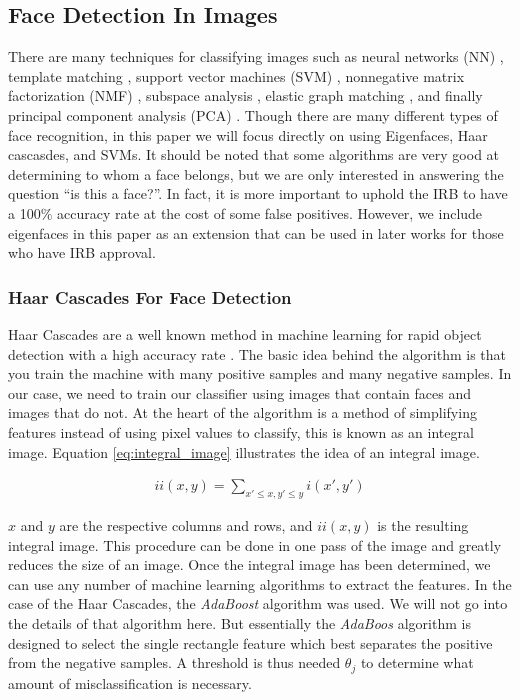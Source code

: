 \documentclass[
	submission,
	final,
	notitlepage,
	narroweqnarray,
	inline,
	twoside,
	]{ieee}
\begin{document}
\subsection{Face Detection In Images}
There are many techniques for classifying images such as neural
networks (NN) \cite{face_neural_net}, template matching \cite{face_template}, support vector machines (SVM) \cite{face_svm},
nonnegative matrix factorization (NMF) \cite{face_mat_fact}, subspace analysis \cite{face_subspace_analysis},
elastic graph matching \cite{face_elastic_bunch}, and finally principal component analysis (PCA) \cite{face_kpca}.
Though there are many different types of face recognition, in this paper we
will focus directly on using Eigenfaces, Haar cascasdes, and SVMs. It should be noted
that some algorithms are very good at determining to whom a face
belongs, but we are only interested in answering the question
``is this a face?''. In fact, it is more important to uphold the IRB
to have a 100\% accuracy rate at the cost of some false positives.
However, we include eigenfaces in this paper as
an extension that can be used in later works for those who have IRB approval.

\subsubsection{Haar Cascades For Face Detection}
Haar Cascades are a well known method in machine learning for rapid object
detection with a high accuracy rate \cite{haar_cascades}. The basic idea
behind the algorithm is that you train the machine with many positive samples
and many negative samples. In our case, we need to train our classifier using
images that contain faces and images that do not. At the heart of the algorithm
is a method of simplifying features instead of using pixel values to classify,
this is known as an integral image. Equation \ref{eq:integral_image} illustrates
the idea of an integral image.


\begin{align}
  ii(x,y) = \sum_{x' \leq x, y' \leq y} i(x', y') \label{eq:integral_image}
\end{align}

$x$ and $y$ are the respective columns and rows, and $ii(x,y)$ is the resulting integral
image. This procedure can be done in one pass of the image and greatly reduces
the size of an image. Once the integral image has been determined, we can use
any number of machine learning algorithms to extract the features. In the case of
the Haar Cascades, the \textit{AdaBoost} algorithm was used. We will not go
into the details of that algorithm here. But essentially the \textit{AdaBoos} algorithm
is designed to select the single rectangle feature which best separates
the positive from the negative samples. A threshold is thus needed $\theta_j$
to determine what amount of misclassification is necessary.
\end{document}

